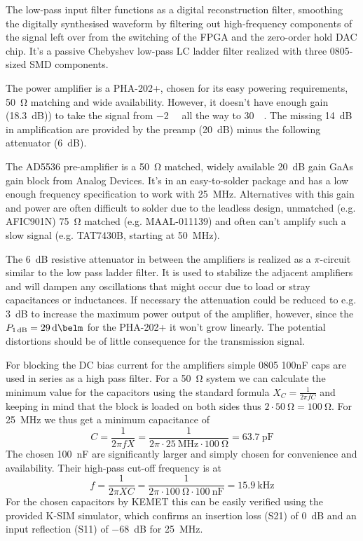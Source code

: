 The low-pass input filter functions as a digital reconstruction filter, smoothing the digitally synthesised waveform by filtering out high-frequency components of the signal left over from the switching of the FPGA and the zero-order hold DAC chip. It's a passive Chebyshev low-pass LC ladder filter realized with three 0805-sized SMD components.

The power amplifier is a PHA-202+, chosen for its easy powering requirements, \qty{50}{\ohm} matching and wide availability. However, it doesn't have enough gain (\qty{18.3}{\deci\bel})) to take the signal from \qty{-2}{\deci\belm} all the way to \qty{+30}{\deci\belm}. The missing \qty{14}{\deci\bel} in amplification are provided by the preamp (\qty{20}{\deci\bel}) minus the following attenuator (\qty{6}{\deci\bel}).

The AD5536 pre-amplifier is a \qty{50}{\ohm} matched, widely available \qty{20}{\deci\bel} gain GaAs gain block from Analog Devices. It's in an easy-to-solder package and has a low enough frequency specification to work with \qty{25}{\mega\hertz}. Alternatives with this gain and power are often difficult to solder due to the leadless design, unmatched (e.g. AFIC901N) \qty{75}{\ohm} matched (e.g. MAAL-011139) and often can't amplify such a slow signal (e.g. TAT7430B, starting at \qty{50}{\mega\hertz}).

The \qty{6}{\deci\bel} resistive attenuator in between the amplifiers is realized as a \(\pi\)-circuit similar to the low pass ladder filter. It is used to stabilize the adjacent amplifiers and will dampen any oscillations that might occur due to load or stray capacitances or inductances. If necessary the attenuation could be reduced to e.g. \qty{3}{\deci\bel} to increase the maximum power output of the amplifier, however, since the \(P_{\qty{1}{\deci\bel}} = \qty{29}{\deci\belm}\) for the PHA-202+ it won't grow linearly. The potential distortions should be of little consequence for the transmission signal.

For blocking the DC bias current for the amplifiers simple 0805 100nF caps are used in series as a high pass filter. For a \qty{50}{\ohm} system we can calculate the minimum value for the capacitors using the standard formula \(X_C = \frac{1}{2\pi{}fC}\) and keeping in mind that the block is loaded on both sides thus \( 2 \cdot \qty{50}{\ohm} = \qty{100}{\ohm}\). For \qty{25}{\mega\hertz} we thus get a minimum capacitance of
\[
    C = \frac{1}{2\pi{}fX} = \frac{1}{2\pi{} \cdot{} \qty{25}{\mega\hertz} \cdot{} \qty{100}{\ohm}} = \qty{63.7}{\pico\farad}
\]
The chosen \qty{100}{\nano\farad} are significantly larger and simply chosen for convenience and availability. Their high-pass cut-off frequency is at
\[
    f = \frac{1}{2\pi{}XC} = \frac{1}{2\pi{} \cdot{} \qty{100}{\ohm} \cdot{} \qty{100}{\nano\farad}} = \qty{15.9}{\kilo\hertz}
\]
For the chosen capacitors by KEMET this can be easily verified using the provided K-SIM simulator, which confirms an insertion loss (S21) of \qty{0}{\deci\bel} and an input reflection (S11) of \qty{-68}{\deci\bel} for \qty{25}{\mega\hertz}.

